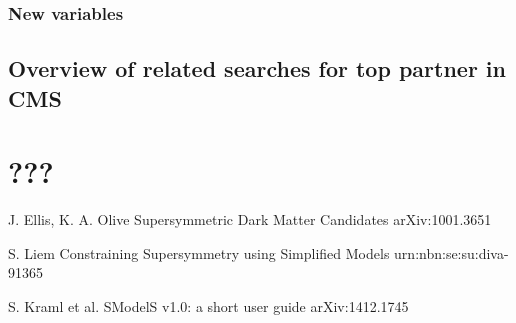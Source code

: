         \subsection{New variables}
        \loremipsum
    
    \section{Overview of related searches for top partner in CMS \label{sec:analysis_overviewStopSearches}}
        \loremipsum

















\chapter{???}
        \loremipsum



        \loremipsum



\begin{thebibliography}{2}
   
             {J. Ellis, K. A. Olive}
             {Supersymmetric Dark Matter Candidates}
             {arXiv:1001.3651}

             {S. Liem}
             {Constraining Supersymmetry using Simplified Models}
             {urn:nbn:se:su:diva-91365}

             {S. Kraml et al.}
             {SModelS v1.0: a short user guide}
             {arXiv:1412.1745}

%
%

\end{thebibliography}


